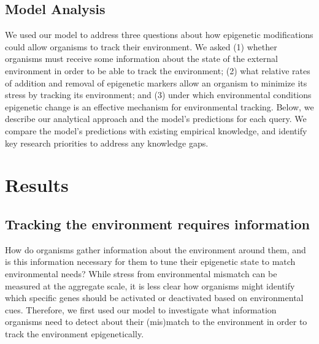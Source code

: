 \documentclass{article}
\begin{document}
\subsection{Model Analysis}
We used our model to address three questions about how epigenetic modifications could allow organisms to track their environment. We asked (1) whether organisms must receive some information about the state of the external environment in order to be able to track the environment; (2) what relative rates of addition and removal of epigenetic markers allow an organism to minimize its stress by tracking its environment; and (3) under which environmental conditions epigenetic change is an effective mechanism for environmental tracking. Below, we describe our analytical approach and the model's predictions for each query. We compare the model's predictions with existing empirical knowledge, and identify key research priorities to address any knowledge gaps.





\clearpage

\section{Results}

\subsection{Tracking the environment requires information}
How do organisms gather information about the environment around them, and is this information necessary for them to tune their epigenetic state to match environmental needs? While stress from environmental mismatch can be measured at the aggregate scale, it is less clear how organisms might identify which specific genes should be activated or deactivated based on environmental cues. Therefore, we first used our model to investigate what information organisms need to detect about their (mis)match to the environment in order to track the environment epigenetically.
\end{document}
